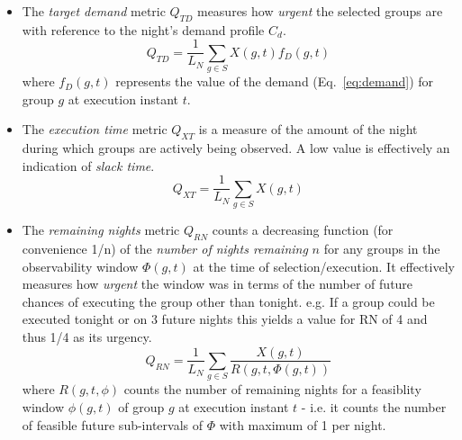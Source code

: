 \begin{itemize}
\item The \emph{target demand} metric $Q_{TD}$  measures how \emph{urgent} the selected groups are with reference to the night's demand profile $C_d$.
\begin{equation}
Q_{TD} = \frac{1}{L_N}\sum_{g \in S}{X(g,t)f_D(g,t)}
\end{equation}
where $f_D(g,t)$ represents the value of the demand (Eq.~\ref{eq:demand}) for group $g$ at execution instant $t$. 


\item The \emph{execution time} metric $Q_{XT}$  is a measure of the amount of the night during which groups are actively being observed. A low value is effectively an indication of \emph{slack time}.
\begin{equation}
Q_{XT} = \frac{1}{L_N}\sum_{g \in S}{X(g,t)}
\end{equation}

\item The \emph{remaining nights} metric $Q_{RN}$  counts a decreasing function (for convenience 1/n) of the \emph{number of nights remaining} $n$ for any groups in the observability window $\Phi(g,t)$ at the time of selection/execution. It effectively measures how \emph{urgent} the window was in terms of the number of future chances of executing 
the group other than tonight. e.g. If a group could be executed tonight or on 3 future nights this yields a value for RN of 4 and thus 1/4 as its urgency.
\begin{equation}
Q_{RN} = \frac{1}{L_N}\sum_{g \in S}{\frac{X(g,t)}{R(g,t,\Phi(g,t))}}
\end{equation}
where $R(g,t,\phi)$ counts the number of remaining nights for a feasiblity window $\phi(g,t)$ of group $g$ at execution instant $t$ - i.e. it counts the number of feasible future sub-intervals of $\Phi$ with maximum of 1 per night.


\end{itemize}
